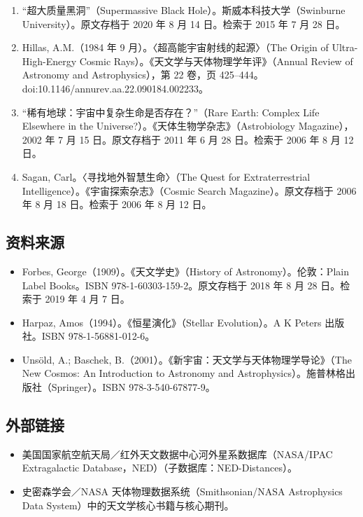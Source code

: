 \begin{enumerate}
  \item “超大质量黑洞”（Supermassive Black Hole）。斯威本科技大学（Swinburne University）。原文存档于 2020 年 8 月 14 日。检索于 2015 年 7 月 28 日。
  \item Hillas, A.M.（1984 年 9 月）。〈超高能宇宙射线的起源〉（The Origin of Ultra-High-Energy Cosmic Rays）。《天文学与天体物理学年评》（Annual Review of Astronomy and Astrophysics），第 22 卷，页 425–444。doi:10.1146/annurev.aa.22.090184.002233。
  \item “稀有地球：宇宙中复杂生命是否存在？”（Rare Earth: Complex Life Elsewhere in the Universe?）。《天体生物学杂志》（Astrobiology Magazine），2002 年 7 月 15 日。原文存档于 2011 年 6 月 28 日。检索于 2006 年 8 月 12 日。
  \item Sagan, Carl。〈寻找地外智慧生命〉（The Quest for Extraterrestrial Intelligence）。《宇宙探索杂志》（Cosmic Search Magazine）。原文存档于 2006 年 8 月 18 日。检索于 2006 年 8 月 12 日。
\end{enumerate}
\subsection{资料来源}
\begin{itemize}
  \item Forbes, George（1909）。《天文学史》（History of Astronomy）。伦敦：Plain Label Books。ISBN 978-1-60303-159-2。原文存档于 2018 年 8 月 28 日。检索于 2019 年 4 月 7 日。
  \item Harpaz, Amos（1994）。《恒星演化》（Stellar Evolution）。A K Peters 出版社。ISBN 978-1-56881-012-6。
  \item Unsöld, A.; Baschek, B.（2001）。《新宇宙：天文学与天体物理学导论》（The New Cosmos: An Introduction to Astronomy and Astrophysics）。施普林格出版社（Springer）。ISBN 978-3-540-67877-9。
\end{itemize}
\subsection{外部链接}
\begin{itemize}
  \item 美国国家航空航天局／红外天文数据中心河外星系数据库（NASA/IPAC Extragalactic Database，NED）（子数据库：NED-Distances）。
  \item 史密森学会／NASA 天体物理数据系统（Smithsonian/NASA Astrophysics Data System）中的天文学核心书籍与核心期刊。
\end{itemize}
